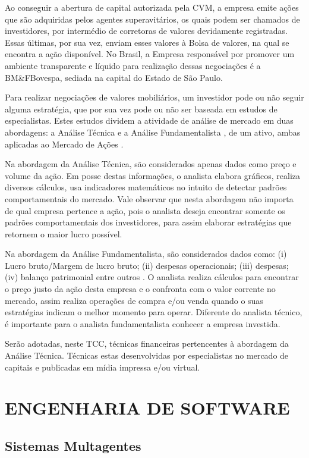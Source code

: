 Ao conseguir a abertura de capital autorizada pela CVM, a empresa emite ações que são adquiridas pelos agentes superavitários, os quais podem ser chamados de investidores, por intermédio de corretoras de valores devidamente registradas. Essas últimas, por sua vez, enviam esses valores à Bolsa de valores, na qual se encontra a ação disponível. No Brasil, a Empresa responsável por promover um ambiente transparente e líquido para realização dessas negociações é a BM\&FBovespa, sediada na capital do Estado de São Paulo.

Para realizar negociações de valores mobiliários, um investidor pode ou não seguir alguma estratégia, que por sua vez pode ou não ser baseada em estudos de especialistas. Estes estudos dividem a atividade de análise de mercado em duas abordagens: a Análise Técnica \cite{noronha2010} e a Análise Fundamentalista \cite{buffet2010}, de um ativo, ambas aplicadas ao Mercado de Ações .

Na abordagem da Análise Técnica, são considerados apenas dados como preço e volume da ação. Em posse destas informações, o analista elabora gráficos, realiza diversos cálculos, usa indicadores matemáticos no intuito de detectar padrões comportamentais do mercado. Vale observar que nesta abordagem não importa de qual empresa pertence a ação, pois o analista deseja encontrar somente os padrões comportamentais dos investidores, para assim elaborar estratégias que retornem o maior lucro possível.

Na abordagem da Análise Fundamentalista, são considerados dados como: (i) Lucro bruto/Margem de lucro bruto; (ii) despesas operacionais; (iii) despesas; (iv) balanço patrimonial  entre outros \cite{buffet2010}. O analista realiza cálculos para encontrar o preço justo da ação desta empresa e o confronta com o valor corrente no mercado, assim realiza operações de compra e/ou venda quando o suas estratégias indicam o melhor momento para operar. Diferente do analista técnico, é importante para o analista fundamentalista conhecer a empresa investida.

Serão adotadas, neste TCC, técnicas financeiras pertencentes à abordagem da Análise Técnica. Técnicas estas desenvolvidas por especialistas no mercado de capitais e publicadas em mídia impressa e/ou virtual.


\section{ENGENHARIA DE SOFTWARE}
\subsection{Sistemas Multagentes}

